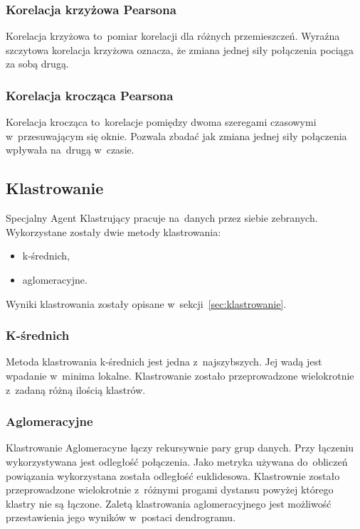 \documentclass[11pt]{report}
\begin{document}
    \subsubsection{Korelacja krzyżowa Pearsona}
    Korelacja krzyżowa to~pomiar korelacji dla różnych przemieszczeń.
    Wyraźna szczytowa korelacja krzyżowa oznacza, że zmiana jednej siły połączenia pociąga za sobą drugą.

    \subsubsection{Korelacja krocząca Pearsona}
    Korelacja krocząca to~korelacje pomiędzy dwoma szeregami czasowymi w~przesuwającym się oknie.
    Pozwala zbadać jak zmiana jednej siły połączenia wpływała na~drugą w~czasie.

    \subsection{Klastrowanie}

    Specjalny Agent Klastrujący pracuje na~danych przez siebie zebranych.
    Wykorzystane zostały dwie metody klastrowania:
    \begin{itemize}
        \item k-średnich,
        \item aglomeracyjne.
    \end{itemize}

    Wyniki klastrowania zostały opisane w~sekcji~\ref{sec:klastrowanie}.

    \subsubsection{K-średnich}
    Metoda klastrowania k-średnich jest jedna z~najszybszych.
    Jej wadą jest wpadanie w~minima lokalne.
    Klastrowanie zostało przeprowadzone wielokrotnie z~zadaną różną ilością klastrów.


    \subsubsection{Aglomeracyjne}
    Klastrowanie Aglomeracyne łączy rekursywnie pary grup danych.
    Przy łączeniu wykorzystywana jest odległość połączenia.
    Jako metryka używana do~obliczeń powiązania wykorzystana została odległość euklidesowa.
    Klastrownie zostało przeprowadzone wielokrotnie z~różnymi progami dystansu powyżej którego klastry nie są łączone.
    Zaletą klastrowania aglomeracyjnego jest możliwość przestawienia jego wyników w~postaci dendrogramu.
\end{document}
